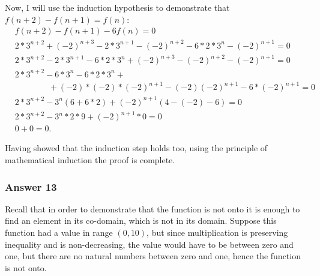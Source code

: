 \documentclass[11pt]{article}
\begin{document}
Now, I will use the induction hypothesis to demonstrate that $f(n+2)-f(n+1)=f(n)$:
\begin{equation*}
  \begin{split}
    & f(n + 2) - f(n + 1) - 6f(n) = 0 \\
    & 2*3^{n+2} + (-2)^{n+3} - 2*3^{n+1} - (-2)^{n+2} - 6*2*3^n - (-2)^{n+1} = 0 \\
    & 2*3^{n+2} - 2*3^{n+1} - 6*2*3^n + (-2)^{n+3} - (-2)^{n+2} - (-2)^{n+1} = 0 \\
    & 2*3^{n+2} - 6*3^n - 6*2*3^n + \\
    & \hspace{4em} + (-2)*(-2)*(-2)^{n+1} - (-2)(-2)^{n+1} - 6*(-2)^{n+1} = 0 \\
    & 2*3^{n+2} - 3^n(6 + 6*2) + (-2)^{n+1}(4 - (-2) - 6) = 0 \\
    & 2*3^{n+2} - 3^n*2*9 + (-2)^{n+1}*0 = 0 \\
    & 0 + 0 = 0.
  \end{split}
\end{equation*}

Having showed that the induction step holds too, using the principle of mathematical
induction the proof is complete.
\subsubsection{Answer 13}
\label{sec-1-4-2}
Recall that in order to demonstrate that the function is not onto it is enough to find
an element in its co-domain, which is not in its domain.  Suppose this function had
a value in range $(0, 10)$, but since multiplication is preserving inequality and
is non-decreasing, the value would have to be between zero and one, but there are no
natural numbers between zero and one, hence the function is not onto.
\end{document}
